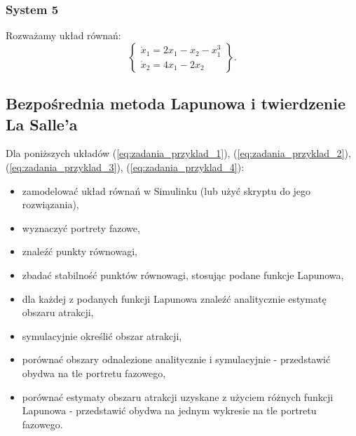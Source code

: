 \documentclass{article}
\begin{document}
        \subsubsection{System 5}
        Rozważamy układ równań:
        \begin{equation}
            \label{eq:posrednia_5}
            \left\{
            \begin{array}{l}
                 \dot{x}_{1} = 2x_{1} - x_{2} - x_{1}^{3}\\
                 \dot{x}_{2} = 4x_{1} - 2x_{2}
            \end{array}
            \right\}.
        \end{equation}

    \subsection{Bezpośrednia metoda Lapunowa i twierdzenie La Salle'a}
    Dla poniższych układów (\ref{eq:zadania_przyklad_1}), (\ref{eq:zadania_przyklad_2}), (\ref{eq:zadania_przyklad_3}), (\ref{eq:zadania_przyklad_4}):
    \begin{itemize}
        \item zamodelować układ równań w Simulinku (lub użyć skryptu do jego rozwiązania),
        \item wyznaczyć portrety fazowe,
        \item znaleźć punkty równowagi,
        \item zbadać stabilność punktów równowagi, stosując podane funkcje Lapunowa,
        \item dla każdej z podanych funkcji Lapunowa znaleźć analitycznie estymatę obszaru atrakcji,
        \item symulacyjnie określić obszar atrakcji,
        \item porównać obszary odnalezione analitycznie i symulacyjnie - przedstawić obydwa na tle portretu fazowego,
        \item porównać estymaty obszaru atrakcji uzyskane z użyciem różnych funkcji Lapunowa - przedstawić obydwa na jednym wykresie na tle portretu fazowego.
    \end{itemize}
\end{document}
